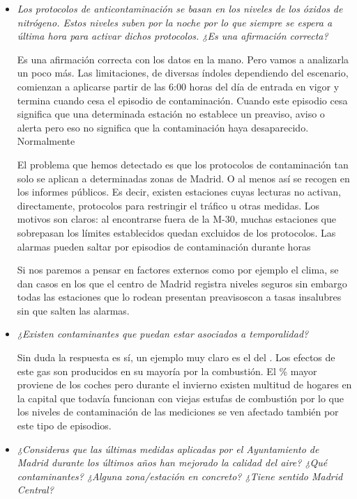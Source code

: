 \begin{itemize}
	\item \textit{Los protocolos de anticontaminación se basan en los niveles de los óxidos de nitrógeno. Estos niveles suben por la noche por lo que siempre se espera a última hora para activar dichos protocolos. ¿Es una afirmación correcta?}
	
	Es una afirmación correcta con los datos en la mano. Pero vamos a analizarla un poco más. Las limitaciones, de diversas índoles dependiendo del escenario, comienzan a aplicarse partir de las 6:00 horas del día de entrada en vigor y termina cuando cesa el episodio de contaminación. Cuando este episodio cesa significa que una determinada estación no establece un preaviso, aviso o alerta pero eso no significa que la contaminación haya desaparecido. Normalmente 
	

	
	El problema que hemos detectado es que los protocolos de contaminación tan solo se aplican a determinadas zonas de Madrid. O al menos así se recogen en los informes públicos. Es decir, existen estaciones cuyas lecturas no activan, directamente, protocolos para restringir el tráfico u otras medidas. Los motivos son claros: al encontrarse fuera de la M-30, muchas estaciones que sobrepasan los límites establecidos quedan excluidos de los protocolos. Las alarmas pueden saltar por episodios de contaminación durante horas
	
	 Si nos paremos a pensar en factores externos como por ejemplo el clima, se dan casos en los que el centro de Madrid registra niveles seguros sin embargo todas las estaciones que lo rodean presentan preavisoscon a tasas insalubres sin que salten las alarmas.
	
	\item \textit{¿Existen contaminantes que puedan estar asociados a temporalidad?}
	
	Sin duda la respuesta es sí, un ejemplo muy claro es el del . Los efectos de este gas son producidos en su mayoría por la combustión. El \% mayor proviene de los coches pero durante el invierno existen multitud de hogares en la capital que todavía funcionan con viejas estufas de combustión por lo que los niveles de contaminación de las mediciones se ven afectado también por este tipo de episodios.
	
	\item \textit{¿Consideras que las últimas medidas aplicadas por el Ayuntamiento de Madrid durante los últimos años han mejorado la calidad del aire? ¿Qué contaminantes? ¿Alguna zona/estación en concreto? ¿Tiene sentido Madrid Central?}
	

\end{itemize}
